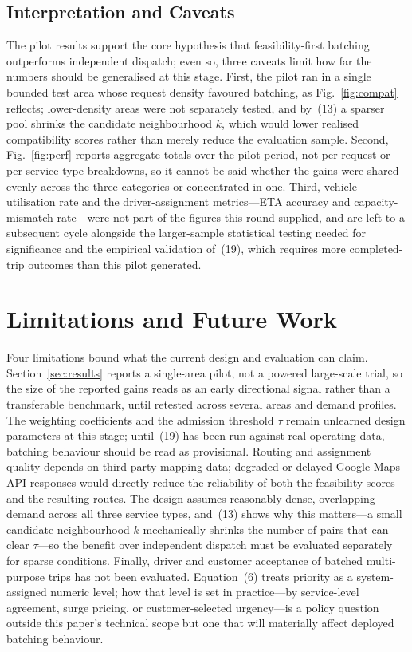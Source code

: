 \documentclass[conference]{IEEEtran}
\begin{document}
\subsection{Interpretation and Caveats}
The pilot results support the core hypothesis that feasibility-first batching
outperforms independent dispatch; even so, three caveats limit how far the
numbers should be generalised at this stage. First, the pilot ran in a single bounded test area whose request density
favoured batching, as Fig.~\ref{fig:compat} reflects; lower-density areas were
not separately tested, and by~(13) a sparser pool shrinks the candidate
neighbourhood $k$, which would lower realised compatibility scores rather than
merely reduce the evaluation sample. Second, Fig.~\ref{fig:perf} reports
aggregate totals over the pilot period, not per-request or per-service-type
breakdowns, so it cannot be said whether the gains were shared evenly across
the three categories or concentrated in one. Third, vehicle-utilisation rate
and the driver-assignment metrics---ETA accuracy and capacity-mismatch
rate---were not part of the figures this round supplied, and are left to a
subsequent cycle alongside the larger-sample statistical testing needed for
significance and the empirical validation of~(19), which requires more
completed-trip outcomes than this pilot generated.

\section{Limitations and Future Work}
\label{sec:limits}
Four limitations bound what the current design and evaluation can claim. Section~\ref{sec:results} reports a single-area pilot, not a powered
large-scale trial, so the size of the reported gains reads as an early directional signal rather
than a transferable benchmark, until retested across several areas and demand
profiles. The weighting coefficients and the admission threshold $\tau$ remain
unlearned design parameters at this stage; until~(19) has been run against
real operating data, batching behaviour should be read as provisional. Routing and assignment quality depends on third-party mapping data;
degraded or delayed Google Maps API responses would directly reduce the
reliability of both the feasibility scores and the resulting routes. The
design assumes reasonably dense, overlapping demand across all three service
types, and~(13) shows why this matters---a small candidate neighbourhood $k$
mechanically shrinks the number of pairs that can clear $\tau$---so the
benefit over independent dispatch must be evaluated separately for sparse
conditions. Finally, driver and customer acceptance of batched multi-purpose
trips has not been evaluated. Equation~(6) treats priority as a
system-assigned numeric level; how that level is set in practice---by
service-level agreement, surge pricing, or customer-selected urgency---is a
policy question outside this paper's technical scope but one that will
materially affect deployed batching behaviour.
\end{document}

